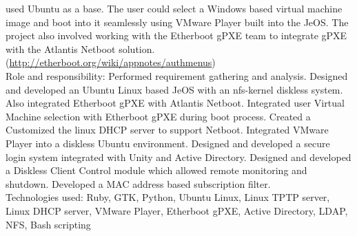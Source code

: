 \documentclass{scrartcl}
\begin{document}
\begin{cv}{
\href{http://www.develmj.com}{}
}
{\begin{itemize}
{used Ubuntu as a base. The user could select a Windows based virtual
machine image and boot into it seamlessly using VMware Player built into the
JeOS. The project also involved working with the Etherboot gPXE team to
integrate gPXE with the Atlantis Netboot solution.
\\(\url{http://etherboot.org/wiki/appnotes/authmenus})}\\
  \vspace{0.5em}
  Role and responsibility: {\scriptsize Performed requirement gathering
  and analysis. Designed and developed an Ubuntu Linux based
  JeOS with an nfs-kernel diskless system. Also integrated Etherboot
  gPXE with Atlantis Netboot. Integrated user Virtual Machine selection with Etherboot
  gPXE during boot process. Created a Customized the linux DHCP server
  to support Netboot. Integrated VMware Player into a diskless Ubuntu
  environment. Designed and developed a secure login system integrated
  with Unity and Active Directory. Designed and developed a Diskless
  Client Control module which allowed remote monitoring and
  shutdown. Developed a MAC address based subscription filter.}\\
\vspace{0.5em}
  Technologies used: {\scriptsize Ruby, GTK, Python, Ubuntu Linux, Linux TPTP server,
  Linux DHCP server, VMware Player, Etherboot gPXE, Active Directory, LDAP,
  NFS, Bash scripting}
\end{itemize}
}

\vspace{0.5em}


\end{cv}
\end{document}

